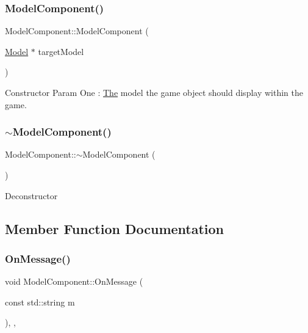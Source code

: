 \subsubsection{\texorpdfstring{Model\+Component()}{ModelComponent()}}
{\footnotesize\ttfamily Model\+Component\+::\+Model\+Component (\begin{DoxyParamCaption}\item[{\mbox{\hyperlink{class_model}{Model}} $\ast$}]{target\+Model }\end{DoxyParamCaption})\hspace{0.3cm}{\ttfamily [inline]}}

Constructor Param One \+: \mbox{\hyperlink{class_the}{The}} model the game object should display within the game. \mbox{\label{class_model_component_a6d490d6a2fdf66ad13ed8adcc39ec611}} 
\subsubsection{\texorpdfstring{$\sim$\+Model\+Component()}{~ModelComponent()}}
{\footnotesize\ttfamily Model\+Component\+::$\sim$\+Model\+Component (\begin{DoxyParamCaption}{ }\end{DoxyParamCaption})\hspace{0.3cm}{\ttfamily [inline]}}

Deconstructor 

\subsection{Member Function Documentation}
\mbox{\label{class_model_component_a48d6170e857f323839039ce54e9418e1}} 
\subsubsection{\texorpdfstring{On\+Message()}{OnMessage()}}
{\footnotesize\ttfamily void Model\+Component\+::\+On\+Message (\begin{DoxyParamCaption}\item[{const std\+::string}]{m }\end{DoxyParamCaption})\hspace{0.3cm}{\ttfamily [inline]}, {\ttfamily [override]}, {\ttfamily [virtual]}}


